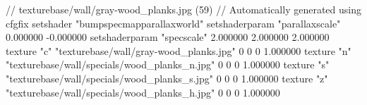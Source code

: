 // texturebase/wall/gray-wood_planks.jpg (59)
// Automatically generated using cfgfix
setshader "bumpspecmapparallaxworld"
setshaderparam "parallaxscale" 0.000000 -0.000000
setshaderparam "specscale" 2.000000 2.000000 2.000000
texture "c" "texturebase/wall/gray-wood_planks.jpg" 0 0 0 1.000000
texture "n" "texturebase/wall/specials/wood_planks_n.jpg" 0 0 0 1.000000
texture "s" "texturebase/wall/specials/wood_planks_s.jpg" 0 0 0 1.000000
texture "z" "texturebase/wall/specials/wood_planks_h.jpg" 0 0 0 1.000000
